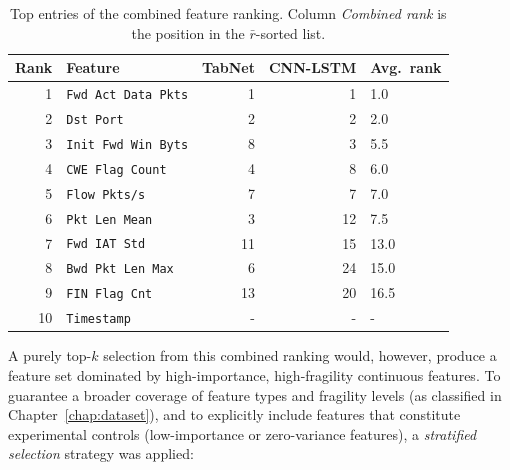 \documentclass[../main.tex]{subfiles}
\begin{document}
\begin{itemize}
    \begin{table}[H]
    \centering
    \caption{Top entries of the combined feature ranking.  Column \emph{Combined rank} is the position in the $\bar{r}$-sorted list.}
    \label{tab:combined-ranking}
    \small
    \begin{tabular}{rlrrl}
    \toprule
    \textbf{Rank} & \textbf{Feature}     & \textbf{TabNet} & \textbf{CNN-LSTM} & \textbf{Avg.\ rank} \\
    \midrule
    1  & \texttt{Fwd Act Data Pkts}   & 1  & 1  & 1.0  \\
    2  & \texttt{Dst Port}            & 2  & 2  & 2.0  \\
    3  & \texttt{Init Fwd Win Byts}   & 8  & 3  & 5.5  \\
    4  & \texttt{CWE Flag Count}      & 4  & 8  & 6.0  \\
    5  & \texttt{Flow Pkts/s}         & 7  & 7  & 7.0  \\
    6  & \texttt{Pkt Len Mean}        & 3  & 12 & 7.5  \\
    7  & \texttt{Fwd IAT Std}         & 11 & 15 & 13.0 \\
    8  & \texttt{Bwd Pkt Len Max}     & 6  & 24 & 15.0 \\
    9  & \texttt{FIN Flag Cnt}        & 13 & 20 & 16.5 \\
    10 & \texttt{Timestamp}          & -  & -  & -    \\
    \bottomrule
    \end{tabular}
    \end{table}
    
    A purely top-$k$ selection from this combined ranking would, however, produce a feature set dominated by high-importance, high-fragility continuous features. To guarantee a broader coverage of feature types and fragility levels (as classified in Chapter~\ref{chap:dataset}), and to explicitly include features that constitute experimental controls (low-importance or zero-variance features), a \emph{stratified selection} strategy was applied:
    

\end{itemize}
\end{document}
